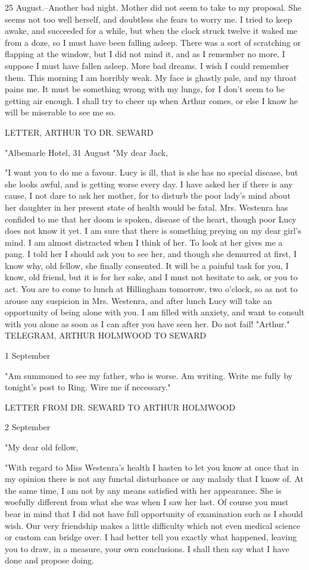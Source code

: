25 August.--Another bad night. Mother did not seem to take to my proposal. She seems not too well herself, and doubtless she fears to worry me. I tried to keep awake, and succeeded for a while, but when the clock struck twelve it waked me from a doze, so I must have been falling asleep. There was a sort of scratching or flapping at the window, but I did not mind it, and as I remember no more, I suppose I must have fallen asleep. More bad dreams. I wish I could remember them. This morning I am horribly weak. My face is ghastly pale, and my throat pains me. It must be something wrong with my lungs, for I don't seem to be getting air enough. I shall try to cheer up when Arthur comes, or else I know he will be miserable to see me so. 

LETTER, ARTHUR TO DR. SEWARD 

"Albemarle Hotel, 31 August "My dear Jack, 

"I want you to do me a favour. Lucy is ill, that is she has no special disease, but she looks awful, and is getting worse every day. I have asked her if there is any cause, I not dare to ask her mother, for to disturb the poor lady's mind about her daughter in her present state of health would be fatal. Mrs. Westenra has confided to me that her doom is spoken, disease of the heart, though poor Lucy does not know it yet. I am sure that there is something preying on my dear girl's mind. I am almost distracted when I think of her. To look at her gives me a pang. I told her I should ask you to see her, and though she demurred at first, I know why, old fellow, she finally consented. It will be a painful task for you, I know, old friend, but it is for her sake, and I must not hesitate to ask, or you to act. You are to come to lunch at Hillingham tomorrow, two o'clock, so as not to arouse any suspicion in Mrs. Westenra, and after lunch Lucy will take an opportunity of being alone with you. I am filled with anxiety, and want to consult with you alone as soon as I can after you have seen her. Do not fail! "Arthur." TELEGRAM, ARTHUR HOLMWOOD TO SEWARD 

1 September 

"Am summoned to see my father, who is worse. Am writing. Write me fully by tonight's post to Ring. Wire me if necessary." 

LETTER FROM DR. SEWARD TO ARTHUR HOLMWOOD 

2 September 

"My dear old fellow, 

"With regard to Miss Westenra's health I hasten to let you know at once that in my opinion there is not any functal disturbance or any malady that I know of. At the same time, I am not by any means satisfied with her appearance. She is woefully different from what she was when I saw her last. Of course you must bear in mind that I did not have full opportunity of examination such as I should wish. Our very friendship makes a little difficulty which not even medical science or custom can bridge over. I had better tell you exactly what happened, leaving you to draw, in a measure, your own conclusions. I shall then say what I have done and propose doing. 

